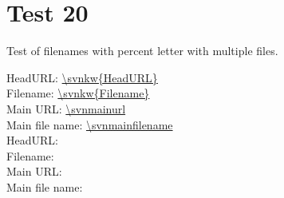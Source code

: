 \documentclass[12pt]{report}
\begin{document}
\chapter{Test 20}
Test of filenames with percent letter with multiple files.

\noindent
HeadURL: \url{\svnkw{HeadURL}} \\
Filename: \url{\svnkw{Filename}} \\
Main URL: \url{\svnmainurl} \\
Main file name: \url{\svnmainfilename} \\

\noindent
HeadURL:  \\
Filename:  \\
Main URL: \svnnolinkurl{\svnmainurl} \\
Main file name: \svnnolinkurl{\svnmainfilename} \\


\end{document}

